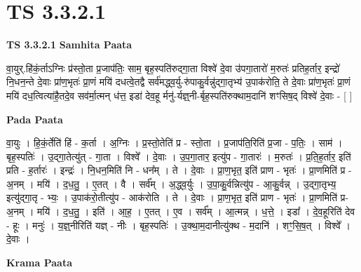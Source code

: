 \documentclass[17pt]{extarticle}
\begin{document}
\section{ TS 3.3.2.1 }

\textbf{TS 3.3.2.1 } \newline
\textbf{Samhita Paata} \newline

वा॒युर्.हि॑कं॒र्ताऽग्निः प्र॑स्तो॒ता प्र॒जाप॑तिः॒ साम॒ बृह॒स्पति॑रुद्गा॒ता विश्वे॑ दे॒वा उ॑पगा॒तारो॑ म॒रुतः॑ प्रतिह॒र्तार॒ इन्द्रो॑ नि॒धन॒न्ते दे॒वाः प्रा॑ण॒भृतः॑ प्रा॒णं मयि॑ दधत्वे॒तद्वै सर्व॑मद्ध्व॒र्यु-रु॑पाकु॒र्वन्नु॑द्गा॒तृभ्य॑ उ॒पाक॑रोति॒ ते दे॒वाः प्रा॑ण॒भृतः॑ प्रा॒णं मयि॑ दध॒त्वित्या॑है॒तदे॒व सव॑र्मा॒त्मन् ध॑त्त॒ इडा॑ देव॒हू र्मनु॑-र्यज्ञ्॒नी-र्बृह॒स्पति॑रुक्थाम॒दानि॑ शꣳसिष॒द् विश्वे॑ दे॒वाः - [  ] \newline

\textbf{Pada Paata} \newline

वा॒युः । हि॒कं॒र्तेति॑ हिं - क॒र्ता । अ॒ग्निः । प्र॒स्तो॒तेति॑ प्र - स्तो॒ता । प्र॒जाप॑ति॒रिति॑ प्र॒जा - प॒तिः॒ । साम॑ । बृह॒स्पतिः॑ । उ॒द्गा॒तेत्यु॑त् - गा॒ता । विश्वे᳚ । दे॒वाः । उ॒प॒गा॒तार॒ इत्यु॑प - गा॒तारः॑ । म॒रुतः॑ । प्र॒ति॒ह॒र्तार॒ इति॑ प्रति - ह॒र्तारः॑ । इन्द्रः॑ । नि॒धन॒मिति॑ नि - धन᳚म् । ते । दे॒वाः । प्रा॒ण॒भृत॒ इति॑ प्राण - भृतः॑ । प्रा॒णमिति॑ प्र - अ॒नम् । मयि॑ । द॒ध॒तु॒ । ए॒तत् । वै । सर्व᳚म् । अ॒द्ध्व॒र्युः । उ॒पा॒कु॒र्वन्नित्यु॑प - आ॒कु॒र्वन्न् । उ॒द्गा॒तृभ्य॒ इत्यु॑द्गा॒तृ - भ्यः॒ । उ॒पाक॑रो॒तीत्यु॑प - आक॑रोति । ते । दे॒वाः । प्रा॒ण॒भृत॒ इति॑ प्राण - भृतः॑ । प्रा॒णमिति॑ प्र-अ॒नम् । मयि॑ । द॒ध॒तु॒ । इति॑ । आ॒ह॒ । ए॒तत् । ए॒व । सर्व᳚म् । आ॒त्मन्न् । ध॒त्ते॒ । इडा᳚ । दे॒व॒हूरिति॑ देव - हूः । मनुः॑ । य॒ज्ञ्॒नीरिति॑ यज्ञ् - नीः । बृह॒स्पतिः॑ । उ॒क्था॒म॒दानीत्यु॑क्थ - म॒दानि॑ । शꣳ॒॒सि॒ष॒त् । विश्वे᳚ । दे॒वाः ।  \newline


\textbf{Krama Paata} \newline
\end{document}
